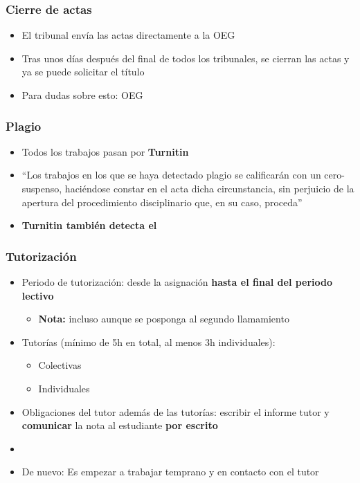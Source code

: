 \documentclass[aspectratio=43]{beamer}
\begin{document}
\begin{frame}
\frametitle{Cierre de actas}
\centering

\begin{itemize}
  \item El tribunal envía las actas directamente a la OEG
  \item Tras unos días después del final de todos los tribunales, se cierran las actas y ya se puede solicitar el título
  \item Para dudas sobre esto: OEG
\end{itemize}

\end{frame}

\begin{frame}
\frametitle{Plagio}
\centering

\begin{itemize}
  \item Todos los trabajos pasan por \textbf{Turnitin}
  \item ``Los trabajos en los que se haya detectado plagio se calificarán con un cero-suspenso, haciéndose constar en el acta dicha circunstancia, sin perjuicio de la apertura del procedimiento disciplinario que, en su caso, proceda''
  \item \textbf{Turnitin también detecta el }
\end{itemize}


\end{frame}

\begin{frame}
\frametitle{Tutorización}
\centering

\begin{itemize}
  \item Periodo de tutorización: desde la asignación \textbf{hasta el final del periodo lectivo}
  \begin{itemize}
    \item \textbf{Nota:} incluso aunque se posponga al segundo llamamiento
  \end{itemize}
  \item Tutorías (mínimo de 5h en total, al menos 3h individuales):
  \begin{itemize}
    \item Colectivas
    \item Individuales
  \end{itemize}
  \item Obligaciones del tutor además de las tutorías: escribir el informe tutor y \textbf{comunicar} la nota al estudiante \textbf{por escrito}
  \item[]
  \item De nuevo: Es \textbf{{\color{red}{importante}}} empezar a trabajar temprano y en contacto con el tutor
\end{itemize}

\end{frame}
\end{document}
